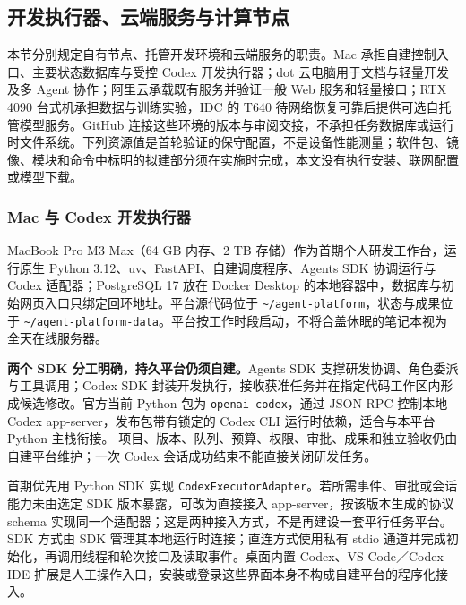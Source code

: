 \documentclass[11pt,a4paper]{article}
\begin{document}
\subsection{开发执行器、云端服务与计算节点}
\label{sec:impl-nodes}

本节分别规定自有节点、托管开发环境和云端服务的职责。Mac 承担自建控制入口、主要状态数据库与受控 Codex 开发执行器；dot 云电脑用于文档与轻量开发及多 Agent 协作；阿里云承载既有服务并验证一般 Web 服务和轻量接口；RTX 4090 台式机承担数据与训练实验，IDC 的 T640 待网络恢复可靠后提供可选自托管模型服务。GitHub 连接这些环境的版本与审阅交接，不承担任务数据库或运行时文件系统。下列资源值是首轮验证的保守配置，不是设备性能测量；软件包、镜像、模块和命令中标明的拟建部分须在实施时完成，本文没有执行安装、联网配置或模型下载。

\subsubsection{Mac 与 Codex 开发执行器}

MacBook Pro M3 Max（64 GB 内存、2 TB 存储）作为首期个人研发工作台，运行原生 Python 3.12、uv、FastAPI、自建调度程序、Agents SDK 协调运行与 Codex 适配器；PostgreSQL 17 放在 Docker Desktop 的本地容器中，数据库与初始网页入口只绑定回环地址。平台源代码位于 \texttt{\textasciitilde/agent-platform}，状态与成果位于 \texttt{\textasciitilde/agent-platform-data}。平台按工作时段启动，不将合盖休眠的笔记本视为全天在线服务器。

\textbf{两个 SDK 分工明确，持久平台仍须自建。}Agents SDK 支撑研发协调、角色委派与工具调用；Codex SDK 封装开发执行，接收获准任务并在指定代码工作区内形成候选修改。官方当前 Python 包为 \texttt{openai-codex}，通过 JSON-RPC 控制本地 Codex app-server，发布包带有锁定的 Codex CLI 运行时依赖，适合与本平台 Python 主栈衔接。\cite{codex-sdk,rdRuntimeSdk} 项目、版本、队列、预算、权限、审批、成果和独立验收仍由自建平台维护；一次 Codex 会话成功结束不能直接关闭研发任务。

首期优先用 Python SDK 实现 \texttt{CodexExecutorAdapter}。若所需事件、审批或会话能力未由选定 SDK 版本暴露，可改为直接接入 app-server，按该版本生成的协议 schema 实现同一个适配器；这是两种接入方式，不是再建设一套平行任务平台。SDK 方式由 SDK 管理其本地运行时连接；直连方式使用私有 stdio 通道并完成初始化，再调用线程和轮次接口及读取事件。桌面内置 Codex、VS Code／Codex IDE 扩展是人工操作入口，安装或登录这些界面本身不构成自建平台的程序化接入。\cite{codex-sdk,codex-app}
\end{document}
